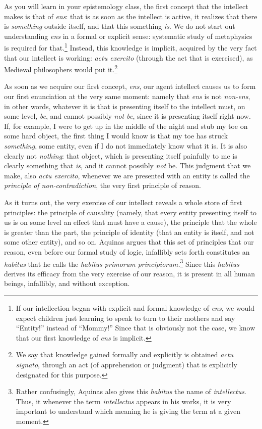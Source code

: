 \documentclass[
  12pt,
]{memoir}
\begin{document}
As you will learn in your epistemology class, the first concept that the
intellect makes is that of \emph{ens}: that is as soon as the intellect
is active, it realizes that there is \emph{something} outside itself,
and that this something \emph{is}. We do not start out understanding
\emph{ens} in a formal or explicit sense: systematic study of
metaphysics is required for that.\footnote{If our intellection began
  with explicit and formal knowledge of \emph{ens}, we would expect
  children just learning to speak to turn to their mothers and say
  ``Entity!'' instead of ``Mommy!'' Since that is obviously not the
  case, we know that our first knowledge of \emph{ens} is implicit.}
Instead, this knowledge is implicit, acquired by the very fact that our
intellect is working: \emph{actu exercito} (through the act that is
exercised), as Medieval philosophers would put it.\footnote{We say that
  knowledge gained formally and explicitly is obtained \emph{actu
  signato}, through an act (of apprehension or judgment) that is
  explicitly designated for this purpose.}

As soon as we acquire our first concept, \emph{ens}, our agent intellect
causes us to form our first enunciation at the very same moment: namely
that \emph{ens} is not \emph{non-ens}, in other words, whatever it is
that is presenting itself to the intellect must, on some level,
\emph{be}, and cannot possibly \emph{not be}, since it is presenting
itself right now. If, for example, I were to get up in the middle of the
night and stub my toe on some hard object, the first thing I would know
is that my toe has struck \emph{something}, some entity, even if I do
not immediately know what it is. It is also clearly not \emph{nothing}:
that object, which is presenting itself painfully to me is clearly
something that \emph{is}, and it cannot possibly \emph{not} be. This
judgment that we make, also \emph{actu exercito}, whenever we are
presented with an entity is called the \emph{principle of
non-contradiction}, the very first principle of reason.

As it turns out, the very exercise of our intellect reveals a whole
store of first principles: the principle of causality (namely, that
every entity presenting itself to us is on some level an effect that
must have a cause), the principle that the whole is greater than the
part, the principle of identity (that an entity is itself, and not some
other entity), and so on. Aquinas argues that this set of principles
that our reason, even before our formal study of logic, infallibly sets
forth constitutes an \emph{habitus} that he calls the \emph{habitus
primorum principiorum.}\footnote{Rather confusingly, Aquinas also gives
  this \emph{habitus} the name of \emph{intellectus}. Thus, it whenever
  the term \emph{intellectus} appears in his works, it is very important
  to understand which meaning he is giving the term at a given moment.}
Since this \emph{habitus} derives its efficacy from the very exercise of
our reason, it is present in all human beings, infallibly, and without
exception.
\end{document}
